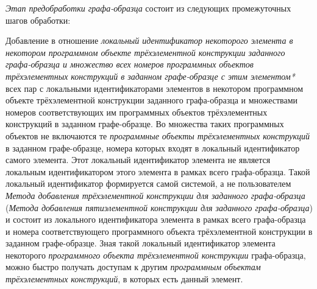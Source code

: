 \textit{Этап предобработки графа-образца} состоит из следующих промежуточных шагов обработки:
\begin{textitemize}
	\item Добавление в отношение \textit{локальный идентификатор некоторого элемента в некотором программном объекте трёхэлементной конструкции заданного графа-образца и множество всех номеров программных объектов трёхэлементных конструкций в заданном графе-образце с этим элементом*} всех пар с локальными идентификаторами элементов в некотором программном объекте трёхэлементной конструкции заданного графа-образца и множествами номеров соответствующих им программных объектов трёхэлементных конструкций в заданном графе-образце. Во множества таких программных объектов не включаются те \textit{программные объекты трёхэлементных конструкций} в заданном графе-образце, номера которых входят в локальный идентификатор самого элемента. Этот локальный идентификатор элемента не является локальным идентификатором этого элемента в рамках всего графа-образца. Такой локальный идентификатор формируется самой системой, а не пользователем \textit{Метода добавления трёхэлементной конструкции для заданного графа-образца} (\textit{Метода добавления пятиэлементной конструкции для заданного графа-образца}) и состоит из локального идентификатора элемента в рамках всего графа-образца и номера соответствующего программного объекта трёхэлементной конструкции в заданном графе-образце. Зная такой локальный идентификатор элемента некоторого \textit{программного объекта трёхэлементной конструкции} графа-образца, можно быстро получать доступам к другим \textit{программным объектам трёхэлементных конструкций}, в которых есть данный элемент.

\end{textitemize}
